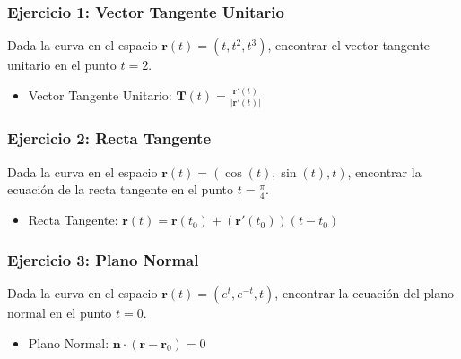 \documentclass{beamer}
\begin{document}
	
	\begin{frame}
		\frametitle{Ejercicio 1: Vector Tangente Unitario}
		Dada la curva en el espacio $\textbf{r}(t) = (t, t^2, t^3)$, encontrar el vector tangente unitario en el punto $t = 2$.
		\pause
		\begin{itemize}
			\item Vector Tangente Unitario: $\textbf{T}(t) = \frac{\textbf{r}'(t)}{\lvert \textbf{r}'(t) \rvert}$
		\end{itemize}
	\end{frame}
	
	\begin{frame}
		\frametitle{Ejercicio 2: Recta Tangente}
		Dada la curva en el espacio $\textbf{r}(t) = (\cos(t), \sin(t), t)$, encontrar la ecuación de la recta tangente en el punto $t = \frac{\pi}{4}$.
		\pause
		\begin{itemize}
			\item Recta Tangente: $\textbf{r}(t) = \textbf{r}(t_0) + (\textbf{r}'(t_0))(t - t_0)$
		\end{itemize}
	\end{frame}
	
	\begin{frame}
		\frametitle{Ejercicio 3: Plano Normal}
		Dada la curva en el espacio $\textbf{r}(t) = (e^t, e^{-t}, t)$, encontrar la ecuación del plano normal en el punto $t = 0$.
		\pause
		\begin{itemize}
			\item Plano Normal: $\textbf{n} \cdot (\textbf{r} - \textbf{r}_0) = 0$
		\end{itemize}
	\end{frame}
	
\end{document}

